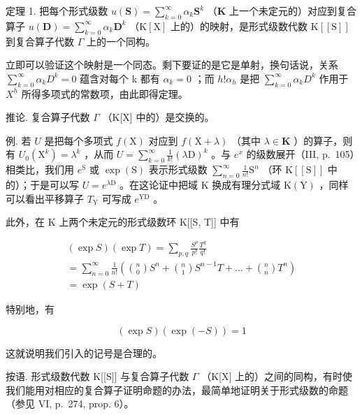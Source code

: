 定理 1. 把每个形式级数 \(u(\mathbf{S}) = \sum_{k=0}^{\infty} \alpha_k \mathbf{S}^k\) （\(\mathbf{K}\) 上一个未定元的）对应到复合算子 \(u(\mathbf{D}) = \sum_{k=0}^{\infty} \alpha_k \mathbf{D}^k\) （\(\mathrm{K}[\mathrm{X}]\) 上的）的映射，是形式级数代数 \(\mathrm{K}[[\mathrm{S}]]\) 到复合算子代数 \(\Gamma\) 上的一个同构。

立即可以验证这个映射是一个同态。剩下要证的是它是单射，换句话说，关系 \(\sum_{k=0}^{\infty}\alpha_{k}D^{k}=0\) 蕴含对每个 k 都有 \(\alpha_{k}=0\) ；而 \(h!\alpha_{h}\) 是把 \(\sum_{k=0}^{\infty}\alpha_{k}D^{k}\) 作用于 \(X^{h}\) 所得多项式的常数项，由此即得定理。

推论. 复合算子代数 \(\Gamma\) （K{[}X{]} 中的）是交换的。

例. 若 \(U\) 是把每个多项式 \(f(\mathrm{X})\) 对应到 \(f(\mathrm{X} + \lambda)\) （其中 \(\lambda \in \mathbf{K}\) ）的算子，则有 \(U_0(\mathrm{X}^k) = \lambda^k\) ，从而 \(U = \sum_{k=0}^{\infty} \frac{1}{k!} (\lambda \mathrm{D})^k\) 。与 \(e^x\) 的级数展开（III, p.~105）相类比，我们用 \(e^{\mathrm{S}}\) 或 \(\exp(\mathrm{S})\) 表示形式级数 \(\sum_{n=0}^{\infty} \frac{1}{n!} \mathrm{S}^n\) （环 \(\mathrm{K}[[\mathrm{S}]]\) 中的）；于是可以写 \(U = e^{\lambda \mathrm{D}}\) 。在这论证中把域 \(\mathrm{K}\) 换成有理分式域 \(\mathrm{K}(\mathrm{Y})\) ，同样可以看出平移算子 \(T_{\mathrm{Y}}\) 可写成 \(e^{\mathrm{YD}}\) 。

此外，在 K 上两个未定元的形式级数环 K{[}{[}S, T{]}{]} 中有

\[
\begin{array}{l} (\exp S) (\exp T) = \sum_ {p, q} \frac {S ^ {p}}{p !} \frac {T ^ {q}}{q !} \\ = \sum_ {n = 0} ^ {\infty} \frac {1}{n !} \left(\binom {n} {0} S ^ {n} + \binom {n} {1} S ^ {n - 1} T + \dots + \binom {n} {n} T ^ {n}\right) \\ = \exp (S + T) \end{array}\tag{4}
\]

特别地，有

\[
(\exp S) (\exp (- S)) = 1\tag{5}
\]

这就说明我们引入的记号是合理的。

按语. 形式级数代数 K{[}{[}S{]}{]} 与复合算子代数 \(\Gamma\) （K{[}X{]} 上的）之间的同构，有时使我们能用对相应的复合算子证明命题的办法，最简单地证明关于形式级数的命题（参见 VI, p.~274, prop. 6）。

